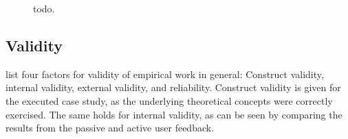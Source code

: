 \begin{figure}[h]
        \caption{todo.}
        \label{figure:evaluation:user:visualization-feature-analysis}
\end{figure}



\subsection{Validity}
\label{subec:evaluation:user:validity}

\citet{Easterbrook2008a} list four factors for validity of empirical work in general: Construct validity, internal validity, external validity, and reliability.
Construct validity is given for the executed case study, as the underlying theoretical concepts were correctly exercised.
The same holds for internal validity, as can be seen by comparing the results from the passive and active user feedback.

